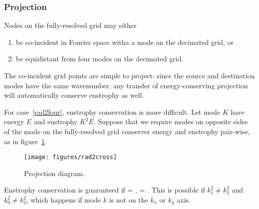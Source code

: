 \documentclass[12pt,showpacs,showkeys,%
amsfonts,amsmath,onecolumn,
floatfix,aps,superscriptaddress]{revtex4}
\begin{document}
\subsubsection{Projection}
Nodes on the fully-resolved grid may either
\begin{enumerate}
\item \label{rad2co}
  be co-incident in Fourier space witha a mode on the decimated grid, or
\item \label{rad2four}
  be equidistant from four modes on the decimated grid.
\end{enumerate}
The co-incident grid points are simple to project: since the source
and destination modes have the same wavenumber, any transfer of
energy-conserving projection will automatically conserve enstrophy as
well.

For case~\ref{rad2four}, enstrophy conservation is more difficult.
Let mode $K$ have energy $E$ and enstrophy $K^2E$.  Suppose that we
require modes on opposite sides of the mode on the fully-resolved grid
conserver energy and enstrophy pair-wise, as in figure~\ref{rad2cross}. 
\begin{figure}[htb]
  \begin{center}
    \texttt{[image: figures/rad2cross]}
    \caption{Projection diagram.}
    \label{rad2cross}
  \end{center}
\end{figure}
Enstrophy conservation is guaranteed if 
\bec
\alpha = ,
\quad
\beta = .
\eec
This is possible if $k_1^2 \neq k_3^2$ and $k_0^2 \neq k_2^2$, which
happens if mode $k$ is not on the $k_x$ or $k_y$ axis. %
\end{document}
